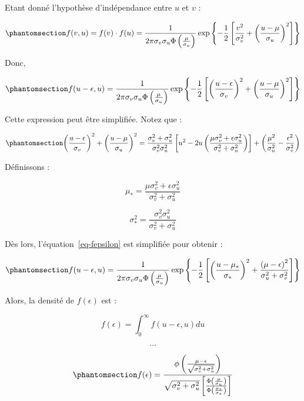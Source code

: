 \documentclass[
  12pt,
]{report}
\begin{document}
Etant donné l'hypothèse d'indépendance entre \(u\) et \(v\) :

\begin{equation}\phantomsection\label{eq-fv-fu}{
f(v,u) = f(v) \cdot f(u) = \frac{1}{2\pi\sigma_v\sigma_u\Phi\left(\frac{\mu}{\sigma_u}\right)}\exp\left\{-\frac{1}{2}\left[\frac{v^2}{\sigma^2_v} + \left(\frac{u-\mu}{\sigma_u}\right)^2\right] \right\}
}\end{equation}

Donc,

\begin{equation}\phantomsection\label{eq-fepsilon}{
f(u-\epsilon, u) = \frac{1}{2\pi\sigma_v\sigma_u\Phi\left(\frac{\mu}{\sigma_u}\right)}\exp\left\{-\frac{1}{2}\left[\left(\frac{u-\epsilon}{\sigma_v}\right)^2 + \left(\frac{u-\mu}{\sigma_u}\right)^2\right] \right\}
}\end{equation}

Cette expression peut être simplifiée. Notez que :

\begin{equation}\phantomsection\label{eq-fepsilon-2}{
\left(\frac{u-\epsilon}{\sigma_v}\right)^2 + \left(\frac{u-\mu}{\sigma_u}\right)^2 = \frac{\sigma^2_v + \sigma^2_u}{\sigma^2_v\sigma^2_u}\left[u^2 - 2u \left( \frac{\mu\sigma^2_v+\epsilon\sigma^2_u}{\sigma^2_v+\sigma^2_u}\right)\right] + \left(\frac{\mu^2}{\sigma^2_u}-\frac{\epsilon^2}{\sigma^2_v}\right)
}\end{equation}

Définissons :

\[
\mu_* = \frac{\mu\sigma^2_v+\epsilon\sigma^2_u}{\sigma^2_v+\sigma^2_u}
\]

\[
\sigma^2_* = \frac{\sigma^2_v\sigma^2_u}{\sigma^2_v + \sigma^2_u}
\]

Dès lors, l'équation~\ref{eq-fepsilon} est simplifiée pour obtenir :

\begin{equation}\phantomsection\label{eq-fepsilon-3}{
f(u-\epsilon, u) = \frac{1}{2\pi\sigma_v\sigma_u\Phi\left(\frac{\mu}{\sigma_u}\right)}\exp\left\{-\frac{1}{2}\left[\left(\frac{u-\mu_*}{\sigma_*}\right)^2+\frac{\left(\mu - \epsilon\right)^2}{\sigma^2_u+\sigma^2_v}\right]\right\}
}\end{equation}

Alors, la densité de \(f(\epsilon)\) est :

\[
f(\epsilon) = \int_0^{\infty}f(u-\epsilon, u)du
\]

\[
\dots
\]

\begin{equation}\phantomsection\label{eq-fepsilon-4}{
f(\epsilon) = \frac{\phi\left(\frac{\mu - \epsilon}{\sqrt{\sigma^2_v+\sigma^2_u}}\right)}{\sqrt{\sigma^2_v+\sigma^2_u}\left[\frac{\Phi\left(\frac{\mu}{\sigma_u}\right)}{\Phi\left(\frac{\mu_*}{\sigma_*}\right)}\right]}
}\end{equation}
\end{document}
